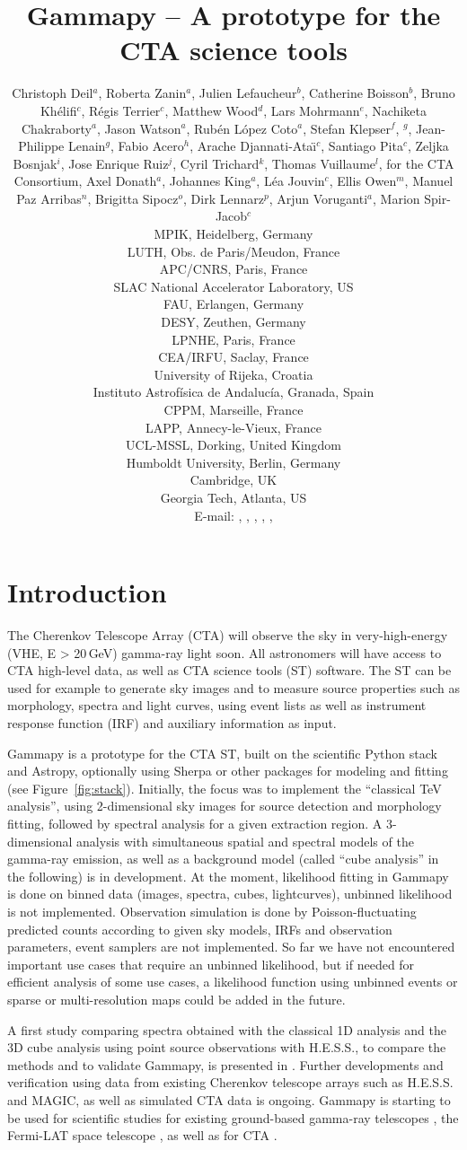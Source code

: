 \documentclass{PoS}
\title{Gammapy -- A prototype for the CTA science tools}
\author{
Christoph Deil$^a$,
Roberta Zanin$^a$,
Julien Lefaucheur$^b$,
Catherine Boisson$^b$,
Bruno Kh\'elifi$^c$,
R\'egis Terrier$^c$,
Matthew Wood$^d$,
Lars Mohrmann$^e$,
Nachiketa Chakraborty$^a$,
Jason Watson$^a$,
Rub\'en L\'opez Coto$^a$,
Stefan Klepser$^f$,
\speaker{Matteo Cerruti}$^g$,
Jean-Philippe Lenain$^g$,
Fabio Acero$^h$,
Arache Djannati-Ata{\"\i}$^c$,
Santiago Pita$^c$,
Zeljka Bosnjak$^i$,
Jose Enrique Ruiz$^j$,
Cyril Trichard$^k$,
Thomas Vuillaume$^l$,
for the CTA Consortium,
Axel Donath$^a$,
Johannes King$^a$,
L\'ea Jouvin$^c$,
Ellis Owen$^m$,
Manuel Paz Arribas$^n$,
Brigitta Sipocz$^o$,
Dirk Lennarz$^p$,
Arjun Voruganti$^a$,
Marion Spir-Jacob$^c$
\\
\llap{$^a$}MPIK, Heidelberg, Germany\\
\llap{$^b$}LUTH, Obs. de Paris/Meudon, France\\
\llap{$^c$}APC/CNRS, Paris, France\\
\llap{$^d$}SLAC National Accelerator Laboratory, US\\
\llap{$^e$}FAU, Erlangen, Germany\\
\llap{$^f$}DESY, Zeuthen, Germany\\
\llap{$^g$}LPNHE, Paris, France\\
\llap{$^h$}CEA/IRFU, Saclay, France\\
\llap{$^i$}University of Rijeka, Croatia\\
\llap{$^j$}Instituto Astrof\'isica de Andaluc\'ia, Granada, Spain\\
\llap{$^k$}CPPM, Marseille, France\\
\llap{$^l$}LAPP, Annecy-le-Vieux, France\\
\llap{$^m$}UCL-MSSL, Dorking, United Kingdom\\
\llap{$^n$}Humboldt University, Berlin, Germany\\
\llap{$^o$}Cambridge, UK\\
\llap{$^p$}Georgia Tech, Atlanta, US\\
E-mail:
\email{Christoph.Deil@mpi-hd.mpg.de},
\email{Roberta.Zanin@mpi-hd.mpg.de},
\email{julien.lefaucheur@obspm.fr},
\email{catherine.boisson@obspm.fr},
\email{khelifi@apc.in2p3.fr},
}
\begin{document}
\section{Introduction}
\label{sec:intro}

The Cherenkov Telescope Array (CTA) will observe the sky in very-high-energy
(VHE, E > 20$\,$GeV) gamma-ray light soon. All astronomers will have access to
CTA high-level data, as well as CTA science tools (ST) software. The ST can be
used for example to generate sky images and to measure source properties such as
morphology, spectra and light curves, using event lists as well as instrument
response function (IRF) and auxiliary information as input.

Gammapy is a prototype for the CTA ST, built on the scientific Python stack and
Astropy, optionally using Sherpa or other packages for modeling and fitting (see
Figure~\ref{fig:stack}). Initially, the focus was to implement the ``classical
TeV analysis'', using 2-dimensional sky images for source detection and
morphology fitting, followed by spectral analysis for a given extraction region.
A 3\hbox{-}dimensional analysis with simultaneous spatial and spectral models of
the gamma-ray emission, as well as a background model (called ``cube analysis''
in the following) is in development. At the moment, likelihood fitting in
Gammapy is done on binned data (images, spectra, cubes, lightcurves), unbinned
likelihood is not implemented. Observation simulation is done by
Poisson-fluctuating predicted counts according to given sky models, IRFs and
observation parameters, event samplers are not implemented. So far we have not
encountered important use cases that require an unbinned likelihood, but if
needed for efficient analysis of some use cases, a likelihood function using
unbinned events or sparse or multi-resolution maps could be added in the future.

A first study comparing spectra obtained with the classical 1D analysis and the
3D cube analysis using point source observations with H.E.S.S., to compare the
methods and to validate Gammapy, is presented in \cite{lea}. Further
developments and verification using data from existing Cherenkov telescope
arrays such as H.E.S.S. and MAGIC, as well as simulated CTA data is ongoing.
Gammapy is starting to be used for scientific studies for existing ground-based
gamma-ray telescopes \cite{hgps, shells}, the Fermi-LAT space telescope
\cite{owen2015}, as well as for CTA \cite{julien, roberta, cyril}.
\end{document}
